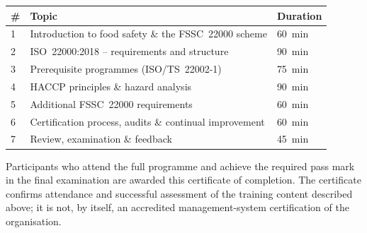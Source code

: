 \renewcommand{\arraystretch}{1.05}
\begin{tabular}{@{}p{0.9cm}p{9.4cm}p{1.9cm}@{}}
  \textbf{\#} & \textbf{Topic} & \textbf{Duration} \\[2pt]
  \hline
  1 & Introduction to food safety \& the FSSC~22000 scheme      & 60~min \\
  2 & ISO~22000:2018 -- requirements and structure               & 90~min \\
  3 & Prerequisite programmes (ISO/TS~22002-1)                   & 75~min \\
  4 & HACCP principles \& hazard analysis                       & 90~min \\
  5 & Additional FSSC~22000 requirements                        & 60~min \\
  6 & Certification process, audits \& continual improvement     & 60~min \\
  7 & Review, examination \& feedback                            & 45~min \\
\end{tabular}

Participants who attend the full programme and achieve the required pass mark
in the final examination are awarded this certificate of completion. The
certificate confirms attendance and successful assessment of the training
content described above; it is not, by itself, an accredited management-system
certification of the organisation.
